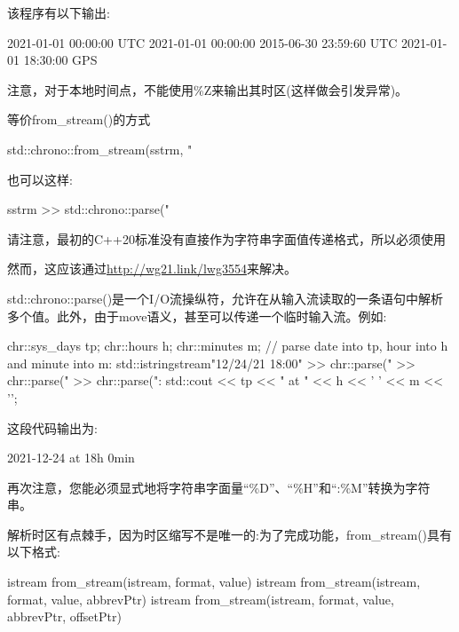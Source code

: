 该程序有以下输出:

\begin{shell}
2021-01-01 00:00:00 UTC
2021-01-01 00:00:00
2015-06-30 23:59:60 UTC
2021-01-01 18:30:00 GPS
\end{shell}

注意，对于本地时间点，不能使用\%Z来输出其时区(这样做会引发异常)。


等价from\_stream()的方式

\begin{cpp}
std::chrono::from_stream(sstrm, "%
\end{cpp}

也可以这样:

\begin{cpp}
sstrm >> std::chrono::parse("%
\end{cpp}

请注意，最初的C++20标准没有直接作为字符串字面值传递格式，所以必须使用


然而，这应该通过\url{http://wg21.link/lwg3554}来解决。

std::chrono::parse()是一个I/O流操纵符，允许在从输入流读取的一条语句中解析多个值。此外，由于move语义，甚至可以传递一个临时输入流。例如:

\begin{cpp}
chr::sys_days tp;
chr::hours h;
chr::minutes m;
// parse date into tp, hour into h and minute into m:
std::istringstream{"12/24/21 18:00"} >> chr::parse("%
									 >> chr::parse(" %
									 >> chr::parse(":%
std::cout << tp << " at " << h << ' ' << m << '\n';
\end{cpp}

这段代码输出为:

\begin{shell}
2021-12-24 at 18h 0min
\end{shell}

再次注意，您能必须显式地将字符串字面量“\%D”、“\%H”和“:\%M”转换为字符串。


解析时区有点棘手，因为时区缩写不是唯一的:为了完成功能，from\_stream()具有以下格式:

\begin{shell}
istream from_stream(istream, format, value)
istream from_stream(istream, format, value, abbrevPtr)
istream from_stream(istream, format, value, abbrevPtr, offsetPtr)
\end{shell}

